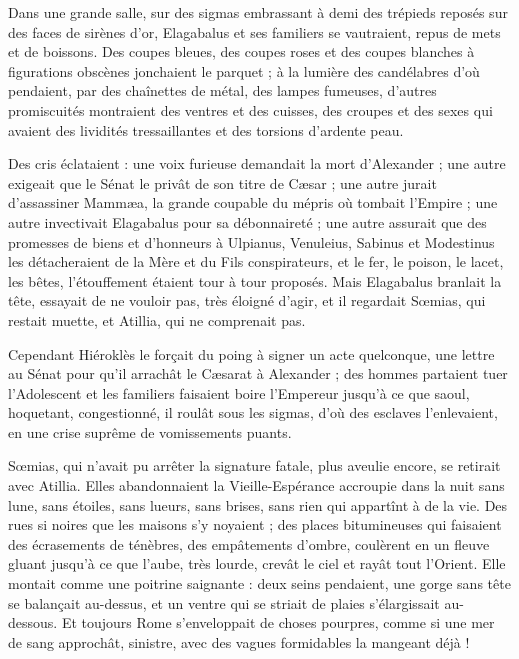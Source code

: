\documentclass[a4paper, 11pt, oneside, polutonikogreek, french]{article}
\begin{document}
Dans une grande salle, sur des sigmas embrassant à demi des trépieds reposés sur des faces de sirènes d'or, Elagabalus et ses familiers se vautraient, repus de mets et de boissons. Des coupes bleues, des coupes roses et des coupes blanches à figurations obscènes jonchaient le parquet ; à la lumière des candélabres d'où pendaient, par des chaînettes de métal, des lampes fumeuses, d'autres promiscuités montraient des ventres et des cuisses, des croupes et des sexes qui avaient des lividités tressaillantes et des torsions d'ardente peau.

Des cris éclataient : une voix furieuse demandait la mort d'Alexander ; une autre exigeait que le Sénat le privât de son titre de Cæsar ; une autre jurait d'assassiner Mammæa, la grande coupable du mépris où tombait l'Empire ; une autre invectivait Elagabalus pour sa débonnaireté ; une autre assurait que des promesses de biens et d'honneurs à Ulpianus, Venuleius, Sabinus et Modestinus les détacheraient de la Mère et du Fils conspirateurs, et le fer, le poison, le lacet, les bêtes, l'étouffement étaient tour à tour proposés. Mais Elagabalus branlait la tête, essayait de ne vouloir pas, très éloigné d'agir, et il regardait Sœmias, qui restait muette, et Atillia, qui ne comprenait pas.

Cependant Hiéroklès le forçait du poing à signer un acte quelconque, une lettre au Sénat pour qu'il arrachât le Cæsarat à Alexander ; des hommes partaient tuer l'Adolescent et les familiers faisaient boire l'Empereur jusqu'à ce que saoul, hoquetant, congestionné, il roulât sous les sigmas, d'où des esclaves l'enlevaient, en une crise suprême de vomissements puants.

Sœmias, qui n'avait pu arrêter la signature fatale, plus aveulie encore, se retirait avec Atillia. Elles abandonnaient la Vieille-Espérance accroupie dans la nuit sans lune, sans étoiles, sans lueurs, sans brises, sans rien qui appartînt à de la vie. Des rues si noires que les maisons s'y noyaient ; des places bitumineuses qui faisaient des écrasements de ténèbres, des empâtements d'ombre, coulèrent en un fleuve gluant jusqu'à ce que l'aube, très lourde, crevât le ciel et rayât tout l'Orient. Elle montait comme une poitrine saignante : deux seins pendaient, une gorge sans tête se balançait au-dessus, et un ventre qui se striait de plaies s'élargissait au-dessous. Et toujours Rome s'enveloppait de choses pourpres, comme si une mer de sang approchât, sinistre, avec des vagues formidables la mangeant déjà !
\clearpage
\subsection{}
\end{document}
